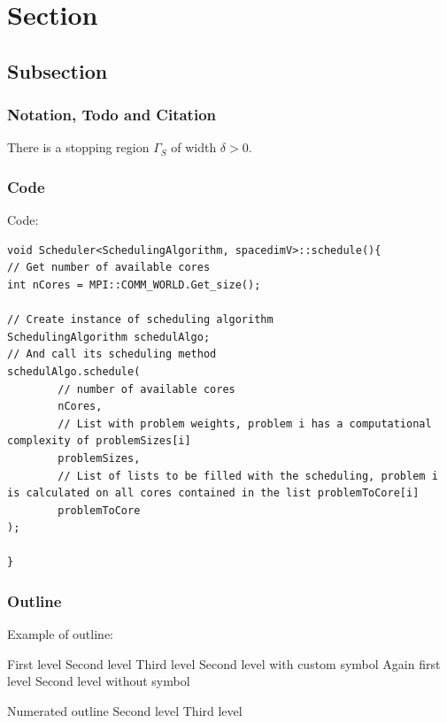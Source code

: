 \section{Section}
\label{section}

\subsection{Subsection}
\label{subsection}

\subsubsection{Notation, Todo and Citation}
\label{notation}
There is a stopping region $\Gamma_S$  of width $\delta>0$. 
\cite{Muller}

\subsubsection{Code}
Code:
\begin{lstlisting}
void Scheduler<SchedulingAlgorithm, spacedimV>::schedule(){
// Get number of available cores
int nCores = MPI::COMM_WORLD.Get_size();

// Create instance of scheduling algorithm
SchedulingAlgorithm schedulAlgo;
// And call its scheduling method
schedulAlgo.schedule( 
        // number of available cores
        nCores,
        // List with problem weights, problem i has a computational complexity of problemSizes[i]
        problemSizes,
        // List of lists to be filled with the scheduling, problem i is calculated on all cores contained in the list problemToCore[i]
        problemToCore
);

}
\end{lstlisting}

\subsubsection{Outline}
Example of outline:
\begin{outline}
    \1 First level
        \2 Second level
            \3 Third level
        \2[+] Second level with custom symbol
    \1 Again first level
        \2[] Second level without symbol
\end{outline}
\begin{outline}[enumerate]
    \1 Numerated outline
        \2 Second level
            \3 Third level
\end{outline}

